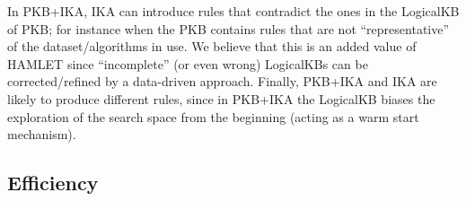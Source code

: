 \documentclass[5p,times]{elsarticle}
\newcommand{\mf}[1]{#1}
\begin{document}

\mf{
In PKB+IKA, IKA can introduce rules that contradict the ones in the LogicalKB of PKB; for instance when the PKB contains rules that are not ``representative'' of the dataset/algorithms in use. We believe that this is an added value of HAMLET since ``incomplete'' (or even wrong) LogicalKBs can be corrected/refined by a data-driven approach. Finally, PKB+IKA and IKA are likely to produce different rules, since in PKB+IKA the LogicalKB biases the exploration of the search space from the beginning (acting as a warm start mechanism).
}

\subsection{Efficiency}

\end{document}
